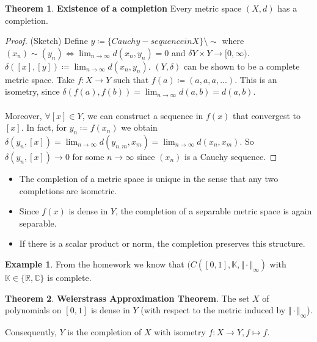 \documentclass[10pt,a4paper]{article}
\theoremstyle{definition}
\theoremstyle{cor}
\theoremstyle{theorem}
\newtheorem{theorem}{Theorem}
\theoremstyle{lemma}
\theoremstyle{example}
\newtheorem{example}{Example}
\begin{document}
\begin{theorem}
\textbf{Existence of a completion} Every metric space $(X, d)$ has a completion.
\end{theorem}
\begin{proof}
(Sketch) Define $y\coloneqq \{ Cauchy-sequence in X\} \setminus \sim $ where $(x_n) \sim (y_n) \Leftrightarrow \lim_{n \rightarrow \infty} d(x_n, y_n) = 0$ and $\delta Y\times Y \rightarrow [0, \infty)$.  $\delta([x], [y]) \coloneqq \lim_{n\rightarrow\infty} d(x_n, y_n)$. $(Y, \delta)$ can be shown to be a complete metric space. Take $f: X\rightarrow Y$ such that $f(a) \coloneqq (a, a, a, ...)$. This is an isometry, since $\delta(f(a), f(b)) = \lim_{n\rightarrow\infty} d(a, b) = d(a, b)$. 
\\ \\
Moreover, $\forall [x] \in Y$, we can construct a sequence in $f(x)$ that convergest to $[x]$. In fact, for $y_n \coloneqq f(x_n)$ we obtain $\delta(y_n, [x]) = \lim_{n\rightarrow\infty} d(y_{n,m}, x_m) = \lim_{n\rightarrow\infty} d(x_n, x_m)$. So $\delta(y_n, [x]) \rightarrow 0$ for some $n \rightarrow \infty$ since $(x_n)$ is a Cauchy sequence. 
\end{proof}
\begin{itemize}
\item The completion of a metric space is unique in the sense that any two completions are isometric. 
\item Since $f(x)$ is dense in $Y$, the completion of a separable metric space is again separable. 
\item If there is a scalar product or norm, the completion preserves this  structure.
\end{itemize}

\begin{example}
From the homework we know that $(C([0, 1], \mathbb{K}, \Vert\cdot\Vert_{\infty})$ with $\mathbb{K} \in \{ \mathbb{R}, \mathbb{C}\}$ is complete.
\end{example}

\begin{theorem}
\textbf{Weierstrass Approximation Theorem}. The set $X$ of polynomials on $[0, 1]$ is dense in $Y$ (with respect to the metric induced by $\Vert \cdot \Vert_{\infty}$).
\end{theorem}
\noindent Consequently, $Y$ is the completion of $X$ with isometry $f: X \rightarrow Y, f \mapsto f$.
\end{document}
